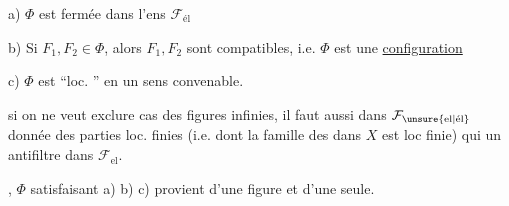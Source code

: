 a) $\Phi$ est fermée dans l'ens  $\mathcal{F}_{\text{él}}$

b) Si  $F_1,F_2\in\Phi$,  alors $F_1,F_2$ sont compatibles, i.e. $\Phi$ est une \uline{configuration}

c) $\Phi$ est ``loc. '' en un sens convenable.

 si on ne veut exclure  cas des figures infinies, il faut aussi  dans $\mathcal{F}_{\unsure{\text{el}|\text{él}}}$  donnée des parties loc. finies (i.e. dont la famille des  dans $X$ est loc finie) qui  un antifiltre dans $\mathcal{F}_{\text{el}}$.

,  $\Phi$ satisfaisant a) b) c) provient d'une figure et d'une seule.
